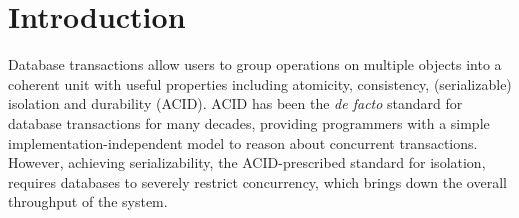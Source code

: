 \section{Introduction}

Database transactions allow users to group operations on multiple
objects into a coherent unit with useful properties including
atomicity, consistency, (serializable) isolation and durability
(ACID). ACID has been the \emph{de facto} standard for database
transactions for many decades, providing programmers with a simple
implementation-independent model to reason about concurrent
transactions. However, achieving serializability, the ACID-prescribed
standard for isolation, requires databases to severely restrict
concurrency, which brings down the overall throughput of the system. 

